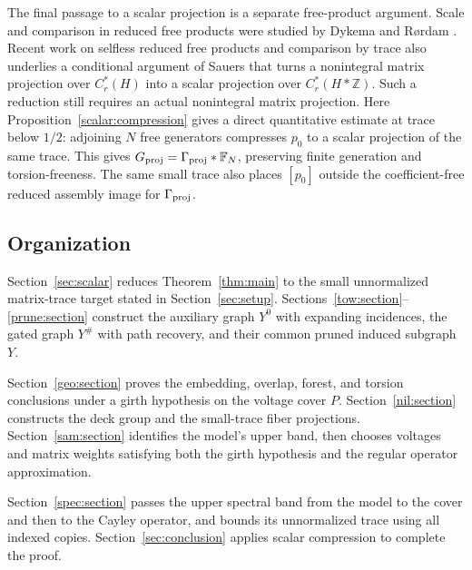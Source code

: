 The final passage to a scalar projection is a separate free-product
argument. Scale and comparison in reduced free products were studied by
Dykema and R{\o}rdam \cite{DR1998,DR2000,DRII2000}.
Recent work on selfless reduced free products and comparison by trace
\cite{FKOP2026,Robert2025} also underlies a conditional argument of
Sauers \cite{Sauers2026} that turns a nonintegral matrix projection over
\(C_r^*(H)\) into a scalar projection over \(C_r^*(H*\mathbb Z)\).
Such a reduction still requires an actual nonintegral matrix projection.
Here Proposition~\ref{scalar:compression} gives a direct quantitative
estimate at trace below \(1/2\): adjoining \(N\) free generators
compresses \(p_0\) to a scalar projection of the same trace. This gives
\(G_{\mathrm{proj}}=\Gamma_{\mathrm{proj}}*\mathbb F_N\), preserving finite generation and
torsion-freeness. The same small trace also places \([p_0]\) outside
the coefficient-free reduced assembly image for \(\Gamma_{\mathrm{proj}}\).

\subsection*{Organization}

Section~\ref{sec:scalar} reduces Theorem~\ref{thm:main} to the small
unnormalized matrix-trace target stated in Section~\ref{sec:setup}.
Sections~\ref{tow:section}--\ref{prune:section} construct the auxiliary
graph \(Y^0\) with expanding incidences, the gated graph \(Y^\#\)
with path recovery, and their common pruned induced subgraph \(Y\).

Section~\ref{geo:section} proves the embedding, overlap, forest, and
torsion conclusions under a girth hypothesis on the voltage cover
\(P\). Section~\ref{nil:section} constructs the deck group and the
small-trace fiber projections. Section~\ref{sam:section} identifies
the model's upper band, then chooses voltages and matrix weights
satisfying both the girth hypothesis and the regular operator
approximation.

Section~\ref{spec:section} passes the upper spectral band from the
model to the cover and then to the Cayley operator, and bounds its
unnormalized trace using all indexed copies. Section~\ref{sec:conclusion}
applies scalar compression to complete the proof.
